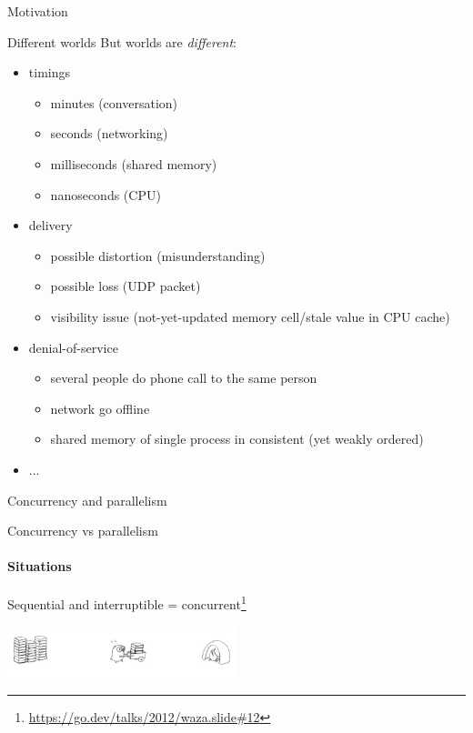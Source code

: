 \begin{section}{Motivation}
\begin{frame}{Different worlds}
But worlds are \textit{different}:
\begin{itemize}
    \item timings
    \begin{itemize}
        \item minutes (conversation)
        \item seconds (networking)
        \item milliseconds (shared memory)
        \item nanoseconds (CPU)
    \end{itemize}
    \item delivery 
    \begin{itemize}
        \item possible distortion (misunderstanding)
        \item possible loss (UDP packet)
        \item visibility issue (not-yet-updated memory cell/stale value in CPU cache)
    \end{itemize}
    \item denial-of-service 
    \begin{itemize}
        \item several people do phone call to the same person
        \item network go offline
        \item shared memory of single process in consistent (yet weakly ordered)
    \end{itemize}
    \item ...
\end{itemize}
\end{frame}


\begin{section}{Concurrency and parallelism}

\showTOC


\begin{frame}[fragile]{Concurrency vs parallelism}
\framesubtitle{Situations}

Sequential and interruptible = concurrent\footnote{\tiny\url{https://go.dev/talks/2012/waza.slide#12}}

\begin{center}
\includegraphics[width=0.5\textwidth]{./pics/gopher_single.png}
\end{center}


\end{frame}
\end{section}
\end{section}
